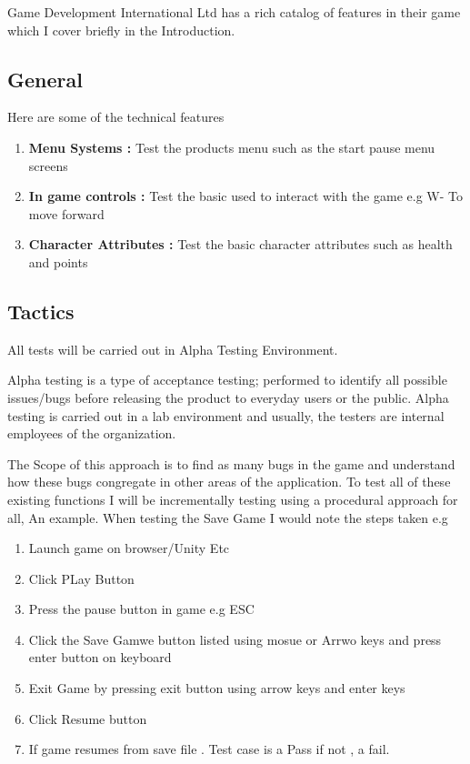 Game Development International Ltd has a rich catalog of features in their game which I cover briefly in
the Introduction.
\subsection{General}
Here are some of the technical features
\begin{enumerate}
  \item    \textbf{Menu Systems :}  Test the products menu such as the start  pause menu screens
  \item    \textbf{In game controls :} Test the basic used to interact with the game e.g W- To move forward
  \item     \textbf{Character Attributes :} Test the basic character attributes such as health and points
\end{enumerate}


\subsection{Tactics}


All tests will be carried out in Alpha Testing Environment.


Alpha testing is a type of acceptance testing; performed to identify all possible issues/bugs before releasing the product to everyday users or the public. Alpha testing is carried out in a lab environment and usually, the testers are internal employees of the organization.


The Scope of this approach is to find as many
bugs in the game and understand how these bugs congregate in other areas of the application.
To test all of these existing functions I will be incrementally testing using a procedural approach for all, An example. When testing the Save Game
I would note the steps taken e.g 

\begin{enumerate}
	\item  Launch game on browser/Unity Etc
	\item  Click PLay Button
	\item Press the pause button in game e.g ESC
	\item  Click the Save Gamwe button listed using mosue or Arrwo keys and press enter button on keyboard
	\item Exit Game by pressing exit button using arrow keys and enter keys 
	\item Click Resume button
	\item If game resumes from save file . Test case is a Pass if not , a fail.

\end{enumerate}

